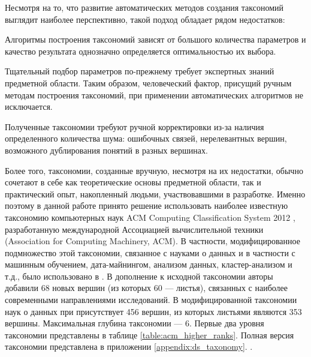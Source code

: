 \documentclass[12pt]{article}
\newenvironment{itemize*}%
{\begin{itemize}%
		\setlength{\itemsep}{0pt}%
		\setlength{\parskip}{0pt}}%
	{\end{itemize}}
\begin{document}
Несмотря на то, что развитие автоматических методов создания таксономий выглядит наиболее перспективно, такой подход обладает рядом недостатков:
\begin{itemize*}
	\item Алгоритмы построения таксономий зависят от большого количества параметров и качество результата однозначно определяется оптимальностью их выбора.
	\item Тщательный подбор параметров по-прежнему требует экспертных знаний предметной области. Таким образом, человеческий фактор, присущий ручным методам построения таксономий, при применении автоматических алгоритмов не исключается.
	\item Полученные таксономии требуют ручной корректировки из-за наличия определенного количества шума: ошибочных связей, нерелевантных вершин, возможного дублирования понятий в разных вершинах.
\end{itemize*}
Более того, таксономии, созданные вручную, несмотря на их недостатки, обычно сочетают в себе как теоретические основы предметной области, так и практический опыт, накопленный людьми, участвовавшими в разработке. Именно поэтому в данной работе принято решение использовать наиболее известную таксономию компьютерных наук ACM Computing Classification System 2012 \cite{associationforcomputingmachinery}, разработанную международной Ассоциацией вычислительной техники (Association for Computing Machinery, ACM). В частности, модифицированное подмножество этой таксономии, связанное с науками о данных и в частности с машинным обучением, дата-майнингом, анализом данных, кластер-анализом и т.д., было использовано в \cite{mirkin2018preprint}. В дополнение к исходной таксономии авторы добавили 68 новых вершин (из которых 60 --- листья), связанных с наиболее современными направлениями исследований. В модифицированной таксономии наук о данных при присутствует 456 вершин, из которых листьями являются 353 вершины. Максимальная глубина таксономии --- 6. Первые два уровня таксономии представлены в таблице \ref{table:acm_higher_ranks}. Полная версия таксономии представлена в приложении \ref{appendix:ds_taxonomy}.
.
\end{document}

